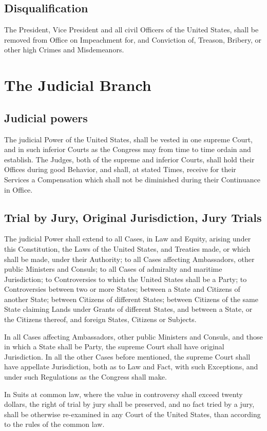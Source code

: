 \documentclass{constitution}
\begin{document}
\section{Disqualification}
The President, Vice President and all civil Officers of the United States,
shall be removed from Office on Impeachment for, and Conviction of,
Treason, Bribery, or other high Crimes and Misdemeanors.

\chapter{The Judicial Branch}
\section{Judicial powers}
The judicial Power of the United States,
shall be vested in one supreme Court,
and in such inferior Courts as the Congress may from time to time ordain and establish.
The Judges, both of the supreme and inferior Courts,
shall hold their Offices during good Behavior,
and shall, at stated Times, receive for their Services a Compensation
which shall not be diminished during their Continuance in Office.

\section{Trial by Jury, Original Jurisdiction, Jury Trials}
The judicial Power shall extend
to all Cases, in Law and Equity, arising under this Constitution,
	the Laws of the United States,
and	Treaties made, or which shall be made, under their Authority;
to all Cases affecting Ambassadors, other public Ministers and Consuls;
to all Cases of admiralty and maritime Jurisdiction;
to Controversies to which the United States shall be a Party;
to Controversies between two or more States;
between a State and Citizens of another State;
between Citizens of different States;
between Citizens of the same State claiming Lands under Grants of different States,
and between a State, or the Citizens thereof, and foreign States, Citizens or Subjects.

In all Cases affecting Ambassadors, other public Ministers and Consuls,
and those in which a State shall be Party,
the supreme Court shall have original Jurisdiction.
In all the other Cases before mentioned,
the supreme Court shall have appellate Jurisdiction, both as to Law and Fact,
with such Exceptions, and under such Regulations as the Congress shall make.

In Suits at common law, where the value in controversy shall exceed twenty dollars,
the right of trial by jury shall be preserved,
and no fact tried by a jury, shall be otherwise re-examined in any Court of the United States,
than according to the rules of the common law.
\end{document}
